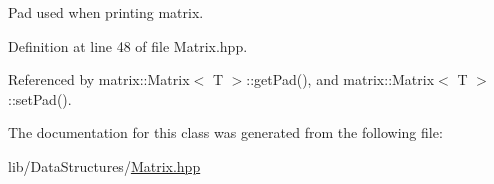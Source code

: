 Pad used when printing matrix. 



Definition at line 48 of file Matrix.\-hpp.



Referenced by matrix\-::\-Matrix$<$ T $>$\-::get\-Pad(), and matrix\-::\-Matrix$<$ T $>$\-::set\-Pad().



The documentation for this class was generated from the following file\-:\begin{DoxyCompactItemize}
\item 
lib/\-Data\-Structures/\hyperlink{Matrix_8hpp}{Matrix.\-hpp}\end{DoxyCompactItemize}
